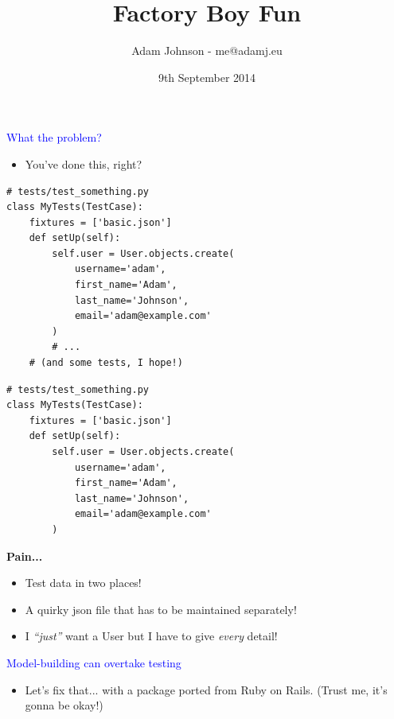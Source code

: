 \documentclass[landscape]{slides}
\title{Factory Boy Fun}
\author{Adam Johnson - me@adamj.eu}
\date{9th September 2014}
\begin{document}
\maketitle

\begin{slide}
    \textcolor{blue}{\Large{What the problem?}}

    \begin{itemize}
        \item You've done this, right?
    \end{itemize}

    \begin{lstlisting}
# tests/test_something.py
class MyTests(TestCase):
    fixtures = ['basic.json']
    def setUp(self):
        self.user = User.objects.create(
            username='adam',
            first_name='Adam',
            last_name='Johnson',
            email='adam@example.com'
        )
        # ...
    # (and some tests, I hope!)
    \end{lstlisting}
\end{slide}


\begin{slide}
    \begin{lstlisting}
# tests/test_something.py
class MyTests(TestCase):
    fixtures = ['basic.json']
    def setUp(self):
        self.user = User.objects.create(
            username='adam',
            first_name='Adam',
            last_name='Johnson',
            email='adam@example.com'
        )
    \end{lstlisting}

    \textbf{Pain...}

    \begin{itemize}
        \item Test data in two places!
        \item A quirky json file that has to be maintained separately!
        \item I \emph{“just”} want a User but I have to give \emph{every} detail!
    \end{itemize}
\end{slide}


\begin{slide}
    \textcolor{blue}{\Large{Model-building can overtake testing}}

    \begin{itemize}
        \item Let's fix that... with a package ported from Ruby on Rails. (Trust me, it's gonna be okay!)
    \end{itemize}
\end{slide}
\end{document}
